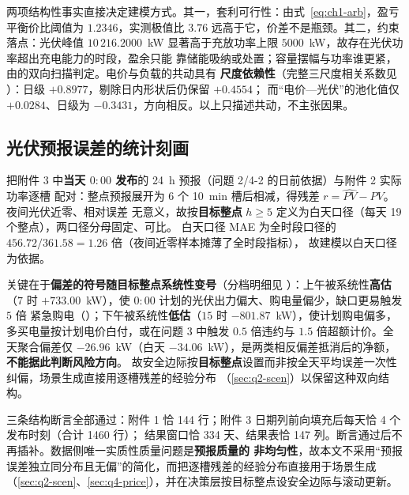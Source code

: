 两项结构性事实直接决定建模方式。其一，套利可行性：由式~\eqref{eq:ch1-arb}，盈亏平衡价比阈值为
\(1.2346\)，实测极值比 \(3.76\) 远高于它，价差不是瓶颈。其二，约束落点：光伏峰值
\(10\,216.2000\)~kW 显著高于充放功率上限 \(5000\)~kW，故存在光伏功率超出充电能力的时段，盈余只能
靠储能吸纳或处置；容量摆幅与功率谁更紧，由的双向扫描判定。电价与负载的共动具有
\textbf{尺度依赖性}（完整三尺度相关系数见 ）：日级 \(+0.8977\)，剔除日内形状后仍保留 \(+0.4554\)；
而“电价—光伏”的池化值仅 \(+0.0284\)、日级为 \(-0.3431\)，方向相反。以上只描述共动，不主张因果。



\subsection{光伏预报误差的统计刻画}\label{sec:data-err}

把附件 3 中\textbf{当天 \(0{:}00\) 发布}的 24~h 预报（问题 2/4-2 的日前依据）与附件 2 实际功率逐槽
配对：整点预报展开为 6 个 10~min 槽后相减，得残差 \(r=\widehat{PV}-PV\)。夜间光伏近零、相对误差
无意义，故按\textbf{目标整点} \(h\ge5\) 定义为白天口径（每天 19 个整点），两口径分母固定、可比。
白天口径 MAE 为全时段口径的 \(456.72/361.58=1.26\) 倍（夜间近零样本摊薄了全时段指标），
故建模以白天口径为依据。

关键在于\textbf{偏差的符号随目标整点系统性变号}（分档明细见 ）：上午被系统性\textbf{高估}
（\(7\) 时 \(+733.00\)~kW），使 \(0{:}00\) 计划的光伏出力偏大、购电量偏少，缺口更易触发 \(5\) 倍
紧急购电（）；下午被系统性\textbf{低估}（\(15\) 时 \(-801.87\)~kW），使计划购电偏多，
多买电量按计划电价白付，或在问题 3 中触发 \(0.5\) 倍违约与 \(1.5\) 倍超额计价。全天聚合偏差仅
\(-26.96\)~kW（白天 \(-34.06\)~kW），是两类相反偏差抵消后的净额，\textbf{不能据此判断风险方向}。
故安全边际按\textbf{目标整点}设置而非按全天平均误差一次性纠偏，场景生成直接用逐槽残差的经验分布
（\ref{sec:q2-scen}）以保留这种双向结构。



三条结构断言全部通过：附件 1 恰 144 行；附件 3 日期列前向填充后每天恰 4 个发布时刻（合计 1460 行）；
结果窗口恰 334 天、结果表恰 147 列。断言通过后不再插补。数据侧唯一实质性质量问题是\textbf{预报质量的
非均匀性}，故本文不采用“预报误差独立同分布且无偏”的简化，而把逐槽残差的经验分布直接用于场景生成
（\ref{sec:q2-scen}、\ref{sec:q4-price}），并在决策层按目标整点设安全边际与滚动更新。

